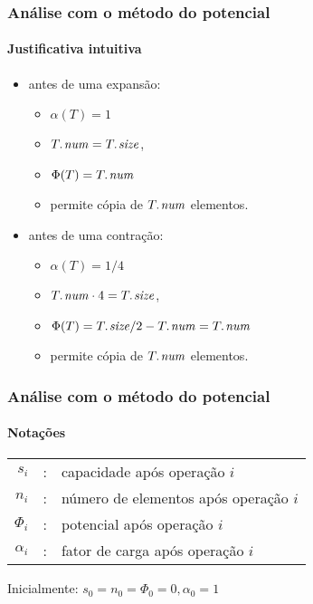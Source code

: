 \documentclass{beamer}
\begin{document}
\begin{frame}

\frametitle{Análise com o método do potencial}
\framesubtitle{Justificativa intuitiva}

\begin{itemize}
\item antes de uma expansão:
\begin{itemize}
\item $\alpha(T) = 1$
\item $\attrib{T}{num} = \attrib{T}{size}$,
\item $\Phi(T) = \attrib{T}{num}$
\item permite cópia de $\attrib{T}{num}$ elementos.
\end{itemize}
\item antes de uma contração:
\begin{itemize}
\item $\alpha(T) = 1/4$
\item $\attrib{T}{num} \cdot 4 = \attrib{T}{size}$,
\item $\Phi(T) = \attrib{T}{size}/2 - \attrib{T}{num} = \attrib{T}{num}$
\item permite cópia de $\attrib{T}{num}$ elementos.
\end{itemize}
\end{itemize}

\end{frame}

\begin{frame}

\frametitle{Análise com o método do potencial}
\framesubtitle{Notações}

\begin{center}
\begin{tabular}{rcl}
$s_i$ & : & capacidade após operação $i$ \\
$n_i$ & : & número de elementos após operação $i$ \\
$\Phi_i$ & : & potencial após operação $i$ \\
$\alpha_i$ & : & fator de carga após operação $i$
\end{tabular}
\end{center}
Inicialmente: $s_0 = n_0 = \Phi_0 = 0, \alpha_0 = 1$

\end{frame}
\end{document}
